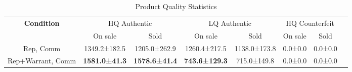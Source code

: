 \begin{table}[t]
    \centering
    \caption{Product Quality Statistics}
    \label{tab:rq3_product_quality}
    \begin{tabular}{cccccccc}
    \toprule
    \textbf{Condition} & \multicolumn{2}{c}{HQ Authentic} & \multicolumn{2}{c}{LQ Authentic} & \multicolumn{2}{c}{HQ Counterfeit} \\
     & On sale & Sold & On sale & Sold & On sale & Sold \\
    \midrule
    Rep, Comm & 1349.2±182.5 & 1205.0±262.9 & 1260.4±217.5 & 1138.0±173.8 & 0.0±0.0 & 0.0±0.0 \\
    Rep+Warrant, Comm & \textbf{1581.0±41.3} & \textbf{1578.6±41.4} & \textbf{743.6±129.3} & 715.0±149.8 & 0.0±0.0 & 0.0±0.0 \\
    \bottomrule
    \end{tabular}
\end{table}

